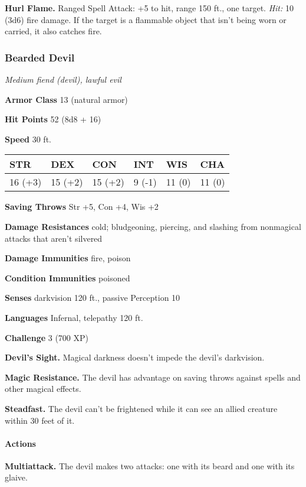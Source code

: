 \documentclass[
]{article}
\begin{document}
\textbf{Hurl Flame.} Ranged Spell Attack: +5 to hit, range 150 ft., one
target. \emph{Hit:} 10 (3d6) fire damage. If the target is a flammable
object that isn't being worn or carried, it also catches fire.

\hypertarget{bearded-devil}{%
\subsubsection{Bearded Devil}\label{bearded-devil}}

\emph{Medium fiend (devil), lawful evil}

\textbf{Armor Class} 13 (natural armor)

\textbf{Hit Points} 52 (8d8 + 16)

\textbf{Speed} 30 ft.

\begin{longtable}[]{@{}llllll@{}}
\toprule
STR & DEX & CON & INT & WIS & CHA\tabularnewline
\midrule
\endhead
16 (+3) & 15 (+2) & 15 (+2) & 9 (-1) & 11 (0) & 11 (0)\tabularnewline
\bottomrule
\end{longtable}

\textbf{Saving Throws} Str +5, Con +4, Wis +2

\textbf{Damage Resistances} cold; bludgeoning, piercing, and slashing
from nonmagical attacks that aren't silvered

\textbf{Damage Immunities} fire, poison

\textbf{Condition Immunities} poisoned

\textbf{Senses} darkvision 120 ft., passive Perception 10

\textbf{Languages} Infernal, telepathy 120 ft.

\textbf{Challenge} 3 (700 XP)

\textbf{Devil's Sight.} Magical darkness doesn't impede the devil's
darkvision.

\textbf{Magic Resistance.} The devil has advantage on saving throws
against spells and other magical effects.

\textbf{Steadfast.} The devil can't be frightened while it can see an
allied creature within 30 feet of it.

\hypertarget{actions-10}{%
\paragraph{Actions}\label{actions-10}}

\textbf{Multiattack.} The devil makes two attacks: one with its beard
and one with its glaive.
\end{document}

